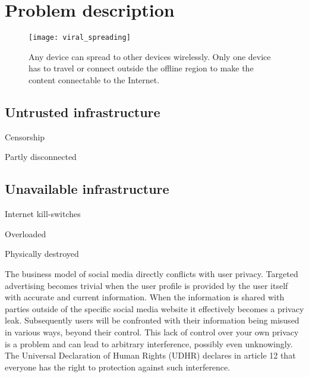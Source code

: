 \chapter{Problem description}




\begin{figure}[h]
	\centering
	\texttt{[image: viral\_spreading]}
	\caption{Any device can spread to other devices wirelessly.
		Only one device has to travel or connect outside the offline region to make the content connectable to the Internet.}
	\label{fig:viral_spreading}
\end{figure}





\section{Untrusted infrastructure}

Censorship

Partly disconnected

\section{Unavailable infrastructure}

Internet kill-switches

Overloaded

Physically destroyed


The business model of social media directly conflicts with user privacy.
Targeted advertising becomes trivial when the user profile is provided by the user itself with accurate and current information.
When the information is shared with parties outside of the specific social media website it effectively becomes a privacy leak.
Subsequently users will be confronted with their information being misused in various ways, beyond their control.
This lack of control over your own privacy is a problem and can lead to arbitrary interference, possibly even unknowingly. %
The Universal Declaration of Human Rights (UDHR) declares in article 12 that everyone has the right to protection against such interference.

